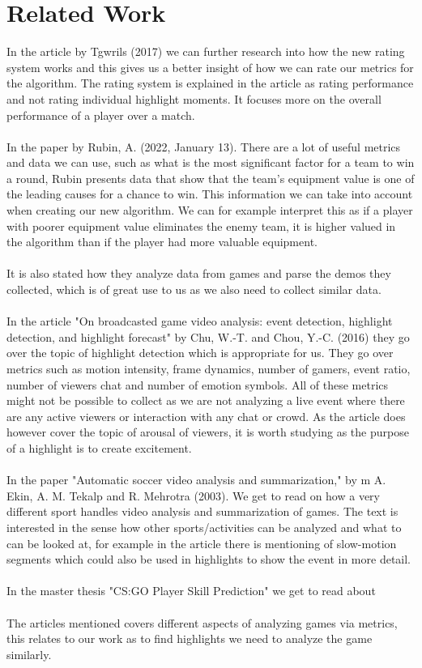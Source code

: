 \chapter{Related Work}
\label{chp:relatedwork}

In the article \cite{Tgwri1s2017} by Tgwrils (2017) we can further research into how the new rating system works and this gives us a better insight of how we can rate our metrics for the algorithm. The rating system is explained in the article as rating performance and not rating individual highlight moments. It focuses more on the overall performance of a player over a match. 
\\\\
In the paper \cite{Rubin2022} by Rubin, A. (2022, January 13). There are a lot of useful metrics and data we can use, such as what is the most significant factor for a team to win a round, Rubin presents data that show that the team's equipment value is one of the leading causes for a chance to win. This information we can take into account when creating our new algorithm. We can for example interpret this as if a player with poorer equipment value eliminates the enemy team, it is higher valued in the algorithm than if the player had more valuable equipment.\\\\ 
It is also stated how they analyze data from games and parse the demos they collected, which is of great use to us as we also need to collect similar data.\\\\
In the article "On broadcasted game video analysis: event detection, highlight detection, and highlight forecast" by Chu, W.-T. and Chou, Y.-C. (2016) they go over the topic of highlight detection which is appropriate for us. They go over metrics such as motion intensity, frame dynamics, number of gamers, event ratio, number of viewers chat and number of emotion symbols. All of these metrics might not be possible to collect as we are not analyzing a live event where there are any active viewers or interaction with any chat or crowd. As the article does however cover the topic of arousal of viewers, it is worth studying as the purpose of a highlight is to create excitement.\\\\
In the paper  "Automatic soccer video analysis and summarization," by m A. Ekin, A. M. Tekalp and R. Mehrotra (2003). We get to read on how a very different sport handles video analysis and summarization of games. The text is interested in the sense how other sports/activities can be analyzed and what to can be looked at, for example in the article there is mentioning of slow-motion segments which could also be used in highlights to show the event in more detail.
\\\\
In the master thesis "CS:GO Player Skill Prediction" \cite{BaranNama} we get to read about 
\\\\
The articles mentioned covers different aspects of analyzing games via metrics, this relates to our work as to find highlights we need to analyze the game similarly. 